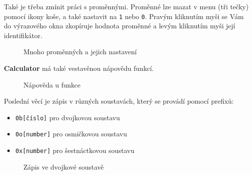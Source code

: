 \documentclass[a4paper, 11pt]{article}
\begin{document}
Také je třeba zmínit práci s proměnnými. Proměnné lze mazat v menu (tři
tečky) pomocí ikony koše, a také nastavit na \texttt{1} nebo \texttt{0}.
Pravým kliknutím myši se Vám do výrazového okna zkopíruje hodnota
proměnné a levým kliknutím myši její identifikátor.

\begin{figure}[H]
    \centering
    \caption{Mnoho proměnných a jejich nastavení}
\end{figure}

\noindent
\textbf{Calculator} má také vestavěnou nápovědu funkcí.

\begin{figure}[H]
    \centering
    \caption{Nápověda u funkce}
\end{figure}

\noindent
Poslední věcí je zápis v různých soustavách, který se provádí pomocí
prefixů:
\begin{itemize}
    \item \texttt{0b{[}číslo{]}} pro dvojkovou soustavu 
    \item \texttt{0o{[}number{]}} pro osmičkovou soustavu 
    \item \texttt{0x{[}number{]}} pro šestnáctkovou soustavu
\end{itemize}

\begin{figure}[H]
    \centering
    \caption{Zápis ve dvojkové soustavě}
\end{figure}
\end{document}

